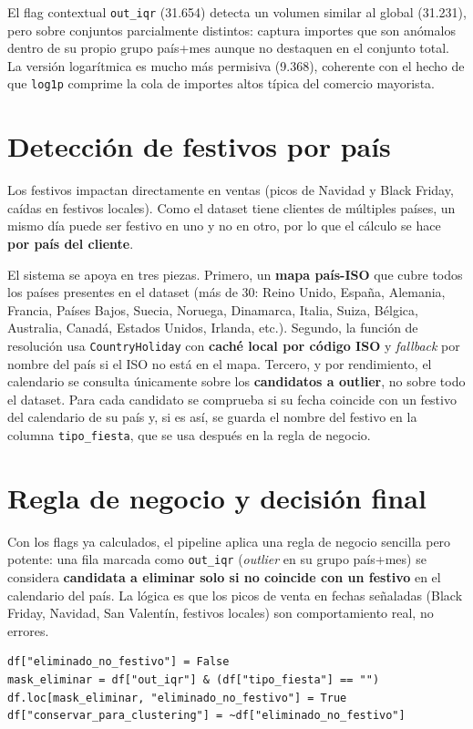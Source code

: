 \documentclass[11pt,a4paper]{article}
\begin{document}
El flag contextual \texttt{out\_iqr} (31.654) detecta un volumen similar al global (31.231), pero sobre conjuntos parcialmente distintos: captura importes que son anómalos dentro de su propio grupo país+mes aunque no destaquen en el conjunto total. La versión logarítmica es mucho más permisiva (9.368), coherente con el hecho de que \texttt{log1p} comprime la cola de importes altos típica del comercio mayorista.

\section{Detección de festivos por país}

Los festivos impactan directamente en ventas (picos de Navidad y Black Friday, caídas en festivos locales). Como el dataset tiene clientes de múltiples países, un mismo día puede ser festivo en uno y no en otro, por lo que el cálculo se hace \textbf{por país del cliente}.

El sistema se apoya en tres piezas. Primero, un \textbf{mapa país-ISO} que cubre todos los países presentes en el dataset (más de 30: Reino Unido, España, Alemania, Francia, Países Bajos, Suecia, Noruega, Dinamarca, Italia, Suiza, Bélgica, Australia, Canadá, Estados Unidos, Irlanda, etc.). Segundo, la función de resolución usa \texttt{CountryHoliday} con \textbf{caché local por código ISO} y \textit{fallback} por nombre del país si el ISO no está en el mapa. Tercero, y por rendimiento, el calendario se consulta únicamente sobre los \textbf{candidatos a outlier}, no sobre todo el dataset. Para cada candidato se comprueba si su fecha coincide con un festivo del calendario de su país y, si es así, se guarda el nombre del festivo en la columna \texttt{tipo\_fiesta}, que se usa después en la regla de negocio.

\section{Regla de negocio y decisión final}

Con los flags ya calculados, el pipeline aplica una regla de negocio sencilla pero potente: una fila marcada como \texttt{out\_iqr} (\textit{outlier} en su grupo país+mes) se considera \textbf{candidata a eliminar solo si no coincide con un festivo} en el calendario del país. La lógica es que los picos de venta en fechas señaladas (Black Friday, Navidad, San Valentín, festivos locales) son comportamiento real, no errores.

\begin{lstlisting}
df["eliminado_no_festivo"] = False
mask_eliminar = df["out_iqr"] & (df["tipo_fiesta"] == "")
df.loc[mask_eliminar, "eliminado_no_festivo"] = True
df["conservar_para_clustering"] = ~df["eliminado_no_festivo"]
\end{lstlisting}
\end{document}
